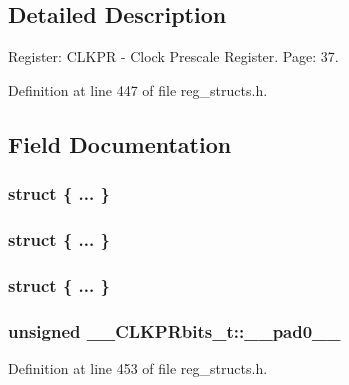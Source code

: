 \subsection{Detailed Description}
Register\+: C\+L\+K\+P\+R -\/ Clock Prescale Register. Page\+: 37. 

Definition at line 447 of file reg\+\_\+structs.\+h.



\subsection{Field Documentation}
\hypertarget{union_____c_l_k_p_rbits__t_aca8fa167c6d870e1f304dc9f626612f2}{\subsubsection[{"@107}]{\setlength{\rightskip}{0pt plus 5cm}struct \{ ... \} }}\label{union_____c_l_k_p_rbits__t_aca8fa167c6d870e1f304dc9f626612f2}
\hypertarget{union_____c_l_k_p_rbits__t_a5d9cc1bc2c7eb6b92e87805ffbb7810e}{\subsubsection[{"@109}]{\setlength{\rightskip}{0pt plus 5cm}struct \{ ... \} }}\label{union_____c_l_k_p_rbits__t_a5d9cc1bc2c7eb6b92e87805ffbb7810e}
\hypertarget{union_____c_l_k_p_rbits__t_adb0bc88ebc5d79ba7570008bd17f87f3}{\subsubsection[{"@111}]{\setlength{\rightskip}{0pt plus 5cm}struct \{ ... \} }}\label{union_____c_l_k_p_rbits__t_adb0bc88ebc5d79ba7570008bd17f87f3}
\hypertarget{union_____c_l_k_p_rbits__t_a970fee87731fbd8d329ca4b723bde70c}{
\subsubsection[{\+\_\+\+\_\+pad0\+\_\+\+\_\+}]{\setlength{\rightskip}{0pt plus 5cm}unsigned \+\_\+\+\_\+\+C\+L\+K\+P\+Rbits\+\_\+t\+::\+\_\+\+\_\+pad0\+\_\+\+\_\+}}\label{union_____c_l_k_p_rbits__t_a970fee87731fbd8d329ca4b723bde70c}


Definition at line 453 of file reg\+\_\+structs.\+h.

